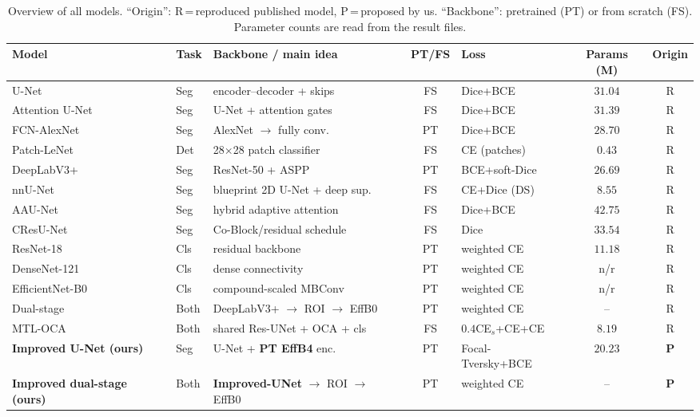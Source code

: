 \documentclass[11pt]{article}
\begin{document}
\begin{table}[t]
\centering
\caption{Overview of all models. ``Origin'': R\,=\,reproduced published model,
P\,=\,proposed by us. ``Backbone'': pretrained (PT) or from scratch (FS).
Parameter counts are read from the result files.}
\label{tab:modeloverview}
\scriptsize
\begin{tabularx}{\linewidth}{@{}l l L{3.0cm} c L{2.5cm} c c@{}}
\toprule
Model & Task & Backbone / main idea & PT/FS & Loss & Params (M) & Origin \\
\midrule
U-Net~\cite{ronneberger2015unet}            & Seg & encoder--decoder + skips        & FS & Dice+BCE       & $31.04$ & R \\
Attention U-Net~\cite{oktay2018attentionunet}& Seg & U-Net + attention gates         & FS & Dice+BCE       & $31.39$ & R \\
FCN-AlexNet~\cite{yap2018cnn}               & Seg & AlexNet $\to$ fully conv.       & PT & Dice+BCE       & $28.70$ & R \\
Patch-LeNet~\cite{yap2018cnn}               & Det & 28$\times$28 patch classifier   & FS & CE (patches)   & $0.43$  & R \\
DeepLabV3+~\cite{chen2018deeplabv3plus}     & Seg & ResNet-50 + ASPP                & PT & BCE+soft-Dice  & $26.69$ & R \\
nnU-Net~\cite{isensee2021nnunet}            & Seg & blueprint 2D U-Net + deep sup.  & FS & CE+Dice (DS)   & $8.55$  & R \\
AAU-Net~\cite{chen2023aaunet}               & Seg & hybrid adaptive attention       & FS & Dice+BCE       & $42.75$ & R \\
CResU-Net~\cite{derakhshandeh2024cresunet}  & Seg & Co-Block/residual schedule      & FS & Dice           & $33.54$ & R \\
ResNet-18~\cite{he2016resnet}               & Cls & residual backbone               & PT & weighted CE    & $11.18$ & R \\
DenseNet-121~\cite{huang2017densenet}       & Cls & dense connectivity              & PT & weighted CE    & n/r     & R \\
EfficientNet-B0~\cite{tan2019efficientnet}  & Cls & compound-scaled MBConv          & PT & weighted CE    & n/r     & R \\
Dual-stage~\cite{bruno2025dualstage}        & Both& DeepLabV3+ $\to$ ROI $\to$ EffB0& PT & weighted CE    & --      & R \\
MTL-OCA~\cite{lu2025multitask}              & Both& shared Res-UNet + OCA + cls     & FS & $0.4$CE$_s$+CE+CE& $8.19$ & R \\
\textbf{Improved U-Net (ours)}              & Seg & U-Net + \textbf{PT EffB4} enc.  & PT & Focal-Tversky+BCE& $20.23$ & \textbf{P} \\
\textbf{Improved dual-stage (ours)}         & Both& \textbf{Improved-UNet} $\to$ ROI $\to$ EffB0 & PT & weighted CE & -- & \textbf{P} \\
\bottomrule
\end{tabularx}
\end{table}
\end{document}
